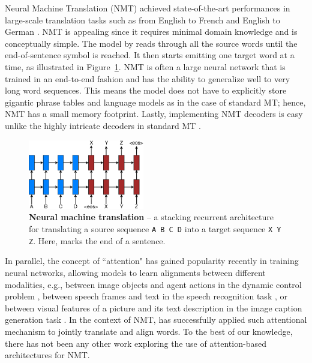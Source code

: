 Neural Machine Translation (NMT) achieved state-of-the-art performances in
large-scale translation tasks such as from English to French \cite{luong15} and
English to German \cite{jean15}. NMT is appealing since it requires minimal
domain knowledge and is conceptually simple. The model by  reads through all the source words until the end-of-sentence symbol \eos{} is reached. It then starts emitting one target word at a time, as illustrated in Figure~\ref{f:lstm}. NMT is often a large neural network that is trained in an end-to-end fashion and has the ability to generalize well to very long word sequences. This means the model does not have to explicitly store gigantic phrase tables and language models as in the case of standard MT; hence, NMT has a small memory footprint. Lastly, implementing NMT decoders is easy unlike the highly intricate decoders in standard MT \cite{Koehn:2003:SMT}.

\begin{figure}
\centering
\includegraphics[width=0.45\textwidth, clip=true, trim= 0 0 0 0]{img/4-lstm} %
\caption[Neural machine translation]{{\bf Neural machine translation} -- a stacking recurrent architecture for translating a source sequence \texttt{A B C D} into a target sequence \texttt{X Y Z}. Here, \eos{} marks the end of a sentence.
} 
\label{f:lstm}
\end{figure}

In parallel, the concept of ``attention" has gained popularity recently in
training neural networks, allowing models to learn alignments between different
modalities, e.g., between image objects and agent actions in the dynamic control
problem \cite{mnih14}, between speech frames and text in the speech recognition
task \cite{jan14},  or between visual features of a picture and its text
description in the image caption generation task \cite{xu15}. In the context of
NMT,  has successfully applied such attentional mechanism to
jointly translate and align words. To the best of our knowledge, there has not
been any other work exploring the use of attention-based architectures for NMT.

